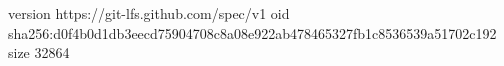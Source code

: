 version https://git-lfs.github.com/spec/v1
oid sha256:d0f4b0d1db3eecd75904708c8a08e922ab478465327fb1c8536539a51702c192
size 32864
